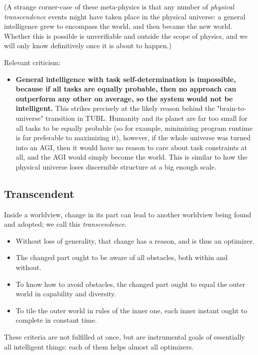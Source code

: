 \documentclass{article}
\begin{document}
(A strange corner-case of these meta-physics is that any number of \textit{physical transcendence} events might have taken place in the physical universe: a general intelligence grew to encompass the world, and then became the new world. Whether this is possible is unverifiable and outside the scope of physics, and we will only know definitively once it is about to happen.)

Relevant criticism:

\begin{itemize}
\item \textbf{General intelligence with task self-determination is impossible, because if all tasks are equally probable, then no approach can outperform any other on average, so the system would not be intelligent.} This strikes precisely at the likely reason behind the "brain-to-universe" transition in TUBL. Humanity and its planet are far too small for all tasks to be equally probable (so for example, minimizing program runtime is far preferable to maximizing it), however, if the whole universe was turned into an AGI, then it would have no reason to care about task constraints at all, and the AGI would simply become the world. This is similar to how the physical universe loses discernible structure at a big enough scale.
\end{itemize}

\subsection{Transcendent}

Inside a worldview, change in its part can lead to another worldview being found and adopted; we call this \textit{transcendence}.

\begin{itemize}
\item Without loss of generality, that change has a reason, and is thus an optimizer.
\item The changed part ought to be aware of all obstacles, both within and without.
\item To know how to avoid obstacles, the changed part ought to equal the outer world in capability and diversity.
\item To tile the outer world in rules of the inner one, each inner instant ought to complete in constant time.
\end{itemize}

These criteria are not fulfilled at once, but are instrumental goals of essentially all intelligent things: each of them helps almost all optimizers.
\end{document}

